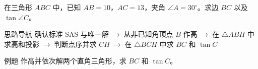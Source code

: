 \documentclass{exam-zh}
\begin{document}






\begin{eduProblemBlock}[例题]
\noindent
\begin{minipage}[t]{\dimexpr\linewidth-70mm-6mm\relax}
\vspace{0pt}
在三角形 $ABC$ 中，已知 $AB=10$，$AC=13$，夹角 $\angle A=30^\circ$。求边 $BC$ 以及
$\tan \angle C$。

\end{minipage}\hfill
\begin{diagramcoltikz}{70mm}{先圈出两条已知边和它们的夹角，再决定从哪个顶点作高。}
}
\end{diagramcoltikz}
\end{eduProblemBlock}





\begin{eduAuxItem}{思路导航}
确认标准 SAS 与唯一解$\;\to\;$从非已知角顶点 $B$ 作高$\;\to\;$在 $\triangle ABH$ 中求高和投影$\;\to\;$判断点序并求 $CH$$\;\to\;$在 $\triangle BCH$ 中求 $BC$ 和 $\tan C$\end{eduAuxItem}




\begin{eduSubQuestionItem}{例题}
作高并依次解两个直角三角形，求 $BC$ 和 $\tan C$。\end{eduSubQuestionItem}
\end{document}
